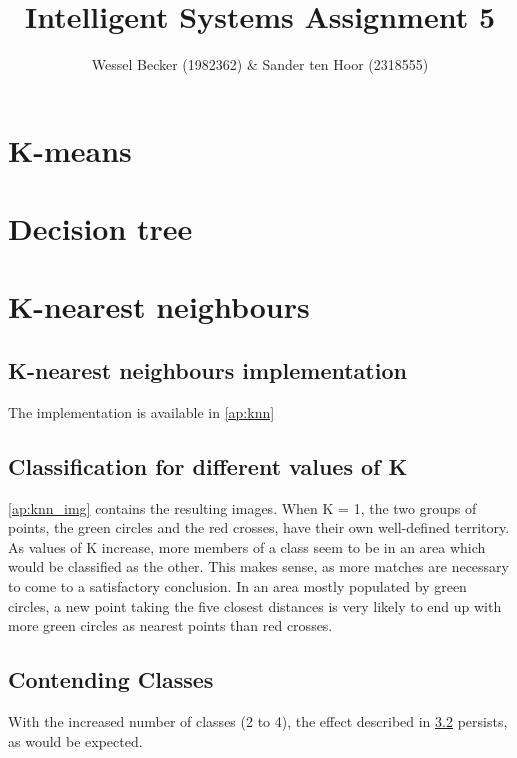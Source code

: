 \documentclass[10pt,a4paper]{article}
\begin{document}
\title{Intelligent Systems Assignment 5}
\author{Wessel Becker (1982362) \& Sander ten Hoor (2318555)}
\maketitle

\newcommand{\simplefigure}[3]{
	\begin{figure}[H]
  	\centering
    	\makebox[\textwidth]
    	{
    		\texttt{[image: \#1]}
 		} \\
  		\caption{#2}
  		\label{#3}
	\end{figure}
}
\newcommand{\mcode}[1]{
	
}

\section{K-means}
\section{Decision tree}
\section{K-nearest neighbours}
\subsection{K-nearest neighbours implementation}
The implementation is available in \ref{ap:knn}

\subsection{Classification for different values of K} \label{ss:class}
\ref{ap:knn_img} contains the resulting images. When K = 1, the two groups of points, the green circles and the red crosses, have their own well-defined territory. As values of K increase, more members of a class seem to be in an area which would be classified as the other. This makes sense, as more matches are necessary to come to a satisfactory conclusion. In an area mostly populated by green circles, a new point taking the five closest distances is very likely to end up with more green circles as nearest points than red crosses.

\subsection{Contending Classes}
With the increased number of classes (2 to 4), the effect described in \ref{ss:class} persists, as would be expected.
\end{document}
